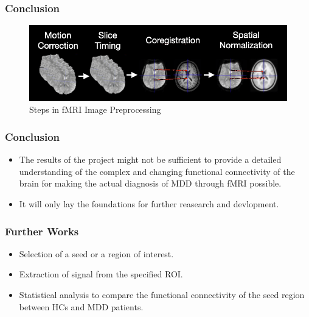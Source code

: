 \documentclass{beamer}
\begin{document}
  \begin{frame}[t]
    \frametitle{Conclusion}

    \vskip 20pt

    \begin{figure}[H]
      \centering
      \includegraphics[width=0.8\linewidth]{./.img/conclusion-preprocessing.png}
      \caption{Steps in fMRI Image Preprocessing}%
      \label{fig:name}
    \end{figure}
  \end{frame}
  \begin{frame}[t]
    \frametitle{Conclusion}

    \vskip 20pt

    \begin{itemize}

      \item The results of the project might not be sufficient to
        provide a detailed understanding of the complex and changing
        functional connectivity of the brain for making the actual
        diagnosis of MDD through fMRI possible.

      \item It will only lay the foundations for further reasearch and
        devlopment.
    \end{itemize}

  \end{frame}

  \begin{frame}[t]
    \frametitle{Further Works}

    \vskip 30pt

    \begin{itemize}

      \item Selection of a seed or a region of interest. \vskip 15pt
      \item Extraction of signal from the specified ROI. \vskip 15pt
      \item Statistical analysis to compare the functional
        connectivity of the seed region between HCs and MDD patients.
    \end{itemize}

  \end{frame}
\end{document}
